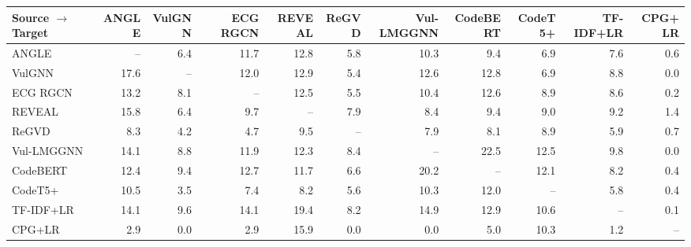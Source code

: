 \begin{tabular}{lrrrrrrrrrr}
\toprule
Source $\rightarrow$ Target & ANGLE & VulGNN & ECG RGCN & REVEAL & ReGVD & Vul-LMGGNN & CodeBERT & CodeT5+ & TF-IDF+LR & CPG+LR \\
\midrule
ANGLE & -- & 6.4 & 11.7 & 12.8 & 5.8 & 10.3 & 9.4 & 6.9 & 7.6 & 0.6 \\
VulGNN & 17.6 & -- & 12.0 & 12.9 & 5.4 & 12.6 & 12.8 & 6.9 & 8.8 & 0.0 \\
ECG RGCN & 13.2 & 8.1 & -- & 12.5 & 5.5 & 10.4 & 12.6 & 8.9 & 8.6 & 0.2 \\
REVEAL & 15.8 & 6.4 & 9.7 & -- & 7.9 & 8.4 & 9.4 & 9.0 & 9.2 & 1.4 \\
ReGVD & 8.3 & 4.2 & 4.7 & 9.5 & -- & 7.9 & 8.1 & 8.9 & 5.9 & 0.7 \\
Vul-LMGGNN & 14.1 & 8.8 & 11.9 & 12.3 & 8.4 & -- & 22.5 & 12.5 & 9.8 & 0.0 \\
CodeBERT & 12.4 & 9.4 & 12.7 & 11.7 & 6.6 & 20.2 & -- & 12.1 & 8.2 & 0.4 \\
CodeT5+ & 10.5 & 3.5 & 7.4 & 8.2 & 5.6 & 10.3 & 12.0 & -- & 5.8 & 0.4 \\
TF-IDF+LR & 14.1 & 9.6 & 14.1 & 19.4 & 8.2 & 14.9 & 12.9 & 10.6 & -- & 0.1 \\
CPG+LR & 2.9 & 0.0 & 2.9 & 15.9 & 0.0 & 0.0 & 5.0 & 10.3 & 1.2 & -- \\
\bottomrule
\end{tabular}
